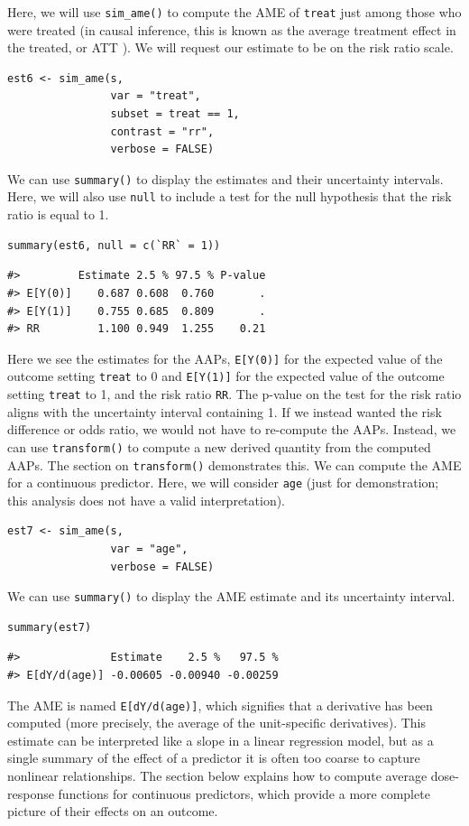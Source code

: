 Here, we will use \texttt{sim\_ame()} to compute the AME of \texttt{treat} just among those who were treated (in causal inference, this is known as the average treatment effect in the treated, or ATT \citep{greiferChoosingCausalEstimand2023}). We will request our estimate to be on the risk ratio scale.
\begin{verbatim}
est6 <- sim_ame(s,
                var = "treat",
                subset = treat == 1,
                contrast = "rr",
                verbose = FALSE)
\end{verbatim}
We can use \texttt{summary()} to display the estimates and their uncertainty intervals. Here, we will also use \texttt{null} to include a test for the null hypothesis that the risk ratio is equal to 1.
\begin{verbatim}
summary(est6, null = c(`RR` = 1))
\end{verbatim}
\begin{verbatim}
#>         Estimate 2.5 % 97.5 % P-value
#> E[Y(0)]    0.687 0.608  0.760       .
#> E[Y(1)]    0.755 0.685  0.809       .
#> RR         1.100 0.949  1.255    0.21
\end{verbatim}
Here we see the estimates for the AAPs, \texttt{E{[}Y(0){]}} for the expected value of the outcome setting \texttt{treat} to 0 and \texttt{E{[}Y(1){]}} for the expected value of the outcome setting \texttt{treat} to 1, and the risk ratio \texttt{RR}. The p-value on the test for the risk ratio aligns with the uncertainty interval containing 1.
If we instead wanted the risk difference or odds ratio, we would not have to re-compute the AAPs. Instead, we can use \texttt{transform()} to compute a new derived quantity from the computed AAPs. The section on \texttt{transform()} demonstrates this.
We can compute the AME for a continuous predictor. Here, we will consider \texttt{age} (just for demonstration; this analysis does not have a valid interpretation).
\begin{verbatim}
est7 <- sim_ame(s,
                var = "age",
                verbose = FALSE)
\end{verbatim}
We can use \texttt{summary()} to display the AME estimate and its uncertainty interval.
\begin{verbatim}
summary(est7)
\end{verbatim}
\begin{verbatim}
#>              Estimate    2.5 %   97.5 %
#> E[dY/d(age)] -0.00605 -0.00940 -0.00259
\end{verbatim}
The AME is named \texttt{E{[}dY/d(age){]}}, which signifies that a derivative has been computed (more precisely, the average of the unit-specific derivatives). This estimate can be interpreted like a slope in a linear regression model, but as a single summary of the effect of a predictor it is often too coarse to capture nonlinear relationships. The section below explains how to compute average dose-response functions for continuous predictors, which provide a more complete picture of their effects on an outcome.
